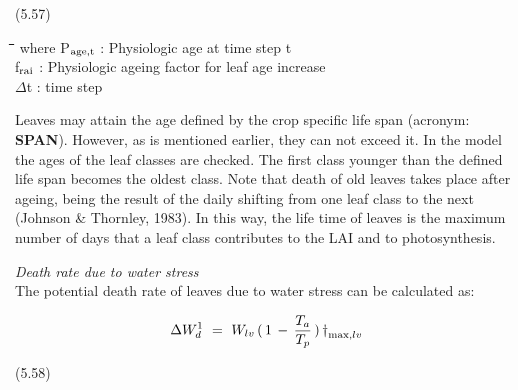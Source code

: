 \documentclass[11pt]{article}
\begin{document}
 \bigskip
\strut\hfill (5.57)
\nwln
\begin{tabbing}
\hspace{1.27cm}\=\hspace{1.27cm}\=\hspace{1.27cm}\=\hspace{1.27cm}\=%
\hspace{1.27cm}\=\hspace{1.27cm}\=\hspace{1.27cm}\=\hspace{1.27cm}\=%
\hspace{1.27cm}\=\hspace{1.27cm}\=\kill
where\> P$_{{\rm age,t}}$\> : Physiologic age at time step t\> \> \> \> \> \> \> \> [d]\\
\>f$_{{\rm rai}}$\> : Physiologic ageing factor for leaf age increase\> \> \> \> \> \> \> \> [-]\\
\>$\Delta$t\> : time step\> \> \> \> \> \> \> \> [d]
\end{tabbing}

 \bigskip
Leaves may attain the age defined by the crop specific life span (acronym: {\bf SPAN}).
However, as is men\-tioned earlier, they can not exceed it. In the model the ages of the
leaf classes are checked. The first class younger than the defined life span becomes the
oldest class. Note that death of old leaves takes place after ageing, being the result of the
daily shifting from one leaf class to the next (Johnson \& Thornley, 1983). In this way,
the life time of leaves is the maximum number of days that a leaf class contributes to the
LAI and to photosyn\-the\-sis.

\bigskip
\bigskip
{\it Death rate due to water stress\/}\\
The potential death rate of leaves due to water stress can be calculated as:

\begin{displaymath}
\Delta W _{d}^{1} ~=~ W _{lv} \, (\, 1\, -\,{\frac{T _{a} }{T _{p} }} \, )\, {\rm \dag } _{\max ,lv} 
\end{displaymath}

 \bigskip
\strut\hfill (5.58)
\end{document}
